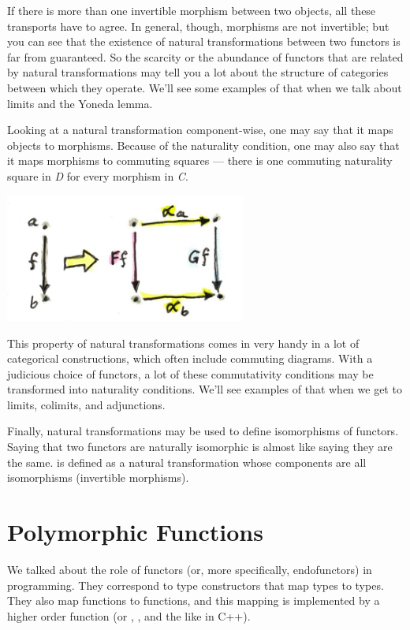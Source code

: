 If there is more than one invertible morphism between two objects, all
these transports have to agree. In general, though, morphisms are not
invertible; but you can see that the existence of natural
transformations between two functors is far from guaranteed. So the
scarcity or the abundance of functors that are related by natural
transformations may tell you a lot about the structure of categories
between which they operate. We'll see some examples of that when we talk
about limits and the Yoneda lemma.

Looking at a natural transformation component-wise, one may say that it
maps objects to morphisms. Because of the naturality condition, one may
also say that it maps morphisms to commuting squares --- there is one
commuting naturality square in \emph{D} for every morphism in \emph{C}.

\includegraphics[width=3.12500in]{images/naturality.jpg}

This property of natural transformations comes in very handy in a lot of
categorical constructions, which often include commuting diagrams. With
a judicious choice of functors, a lot of these commutativity conditions
may be transformed into naturality conditions. We'll see examples of
that when we get to limits, colimits, and adjunctions.

Finally, natural transformations may be used to define isomorphisms of
functors. Saying that two functors are naturally isomorphic is almost
like saying they are the same.  is defined as
a natural transformation whose components are all isomorphisms
(invertible morphisms).

\section{Polymorphic Functions}\label{polymorphic-functions}

We talked about the role of functors (or, more specifically,
endofunctors) in programming. They correspond to type constructors that
map types to types. They also map functions to functions, and this
mapping is implemented by a higher order function  (or
, , and the like in C++).

